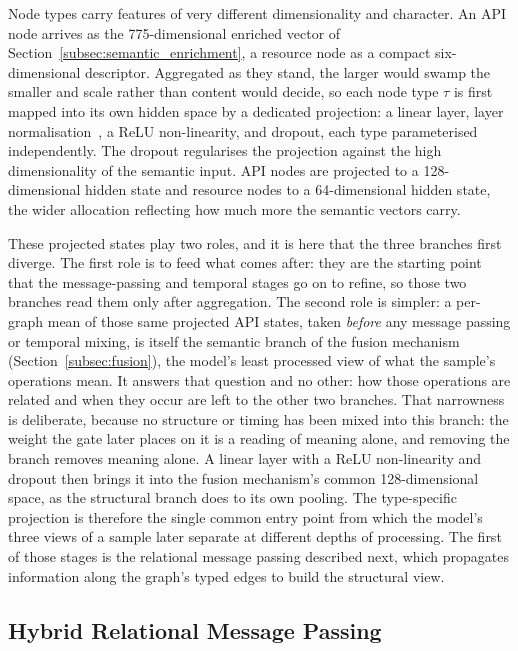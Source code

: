 \documentclass[%
    BCOR=10mm,
    DIV=13,
    toc=bibliography,
    toc=listof,
    oneside,
    12pt,
]{scrbook}
\begin{document}
Node types carry features of very different dimensionality and character. An API
node arrives as the 775-dimensional enriched vector of
Section~\ref{subsec:semantic_enrichment}, a resource node as a compact
six-dimensional descriptor. Aggregated as they stand, the larger would swamp the
smaller and scale rather than content would decide, so each node type $\tau$ is
first mapped into its own hidden space by a dedicated projection: a linear
layer, layer normalisation~\cite{ba2016layernorm}, a ReLU non-linearity, and
dropout, each type parameterised independently. The dropout regularises the
projection against the high dimensionality of the semantic input. API nodes are
projected to a 128-dimensional hidden state and resource nodes to a
64-dimensional hidden state, the wider allocation reflecting how much more the
semantic vectors carry.

These projected states play two roles, and it is here that the three branches
first diverge. The first role is to feed what comes after: they are the starting
point that the message-passing and temporal stages go on to refine, so those two
branches read them only after aggregation. The second role is simpler: a
per-graph mean of those same projected API states, taken \emph{before} any
message passing or temporal mixing, is itself the semantic branch of the fusion
mechanism (Section~\ref{subsec:fusion}), the model's least processed view of
what the sample's operations mean. It answers that question and no other: how
those operations are related and when they occur are left to the other two
branches. That narrowness is deliberate, because no structure or timing has been
mixed into this branch: the weight the gate later places on it is a reading of
meaning alone, and removing the branch removes meaning alone. A linear layer
with a ReLU non-linearity and dropout then brings it into the fusion
mechanism's common 128-dimensional space, as the structural
branch does to its own pooling. The type-specific projection is therefore the
single common entry point from which the model's three views of a sample later
separate at different depths of processing. The first of those stages is the
relational message passing described next, which propagates information along
the graph's typed edges to build the structural view.

\subsection{Hybrid Relational Message Passing}
\label{subsec:hybrid_mp}
\end{document}

